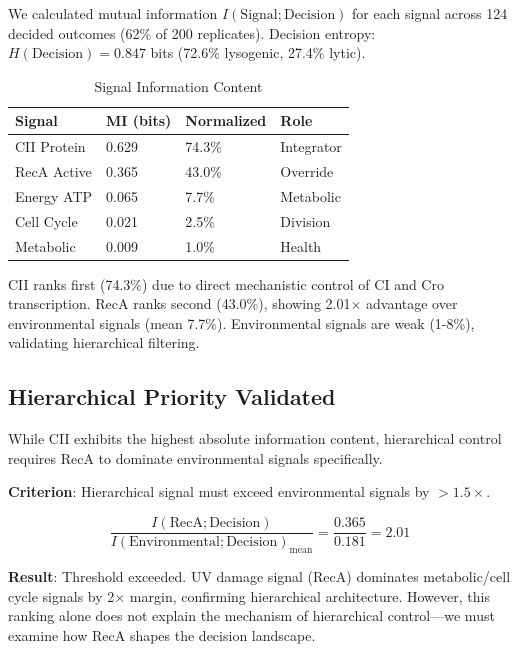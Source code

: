 \documentclass[10pt,twocolumn]{article}
\begin{document}
We calculated mutual information $I(\text{Signal}; \text{Decision})$ for each signal across 124 decided outcomes (62\% of 200 replicates). Decision entropy: $H(\text{Decision}) = 0.847$ bits (72.6\% lysogenic, 27.4\% lytic).

\begin{table}[h]
\centering
\caption{Signal Information Content}
\begin{tabular}{@{}llll@{}}
\toprule
\textbf{Signal} & \textbf{MI (bits)} & \textbf{Normalized} & \textbf{Role} \\
\midrule
CII Protein & 0.629 & 74.3\% & Integrator \\
RecA Active & 0.365 & 43.0\% & Override \\
Energy ATP & 0.065 & 7.7\% & Metabolic \\
Cell Cycle & 0.021 & 2.5\% & Division \\
Metabolic & 0.009 & 1.0\% & Health \\
\bottomrule
\end{tabular}
\end{table}

CII ranks first (74.3\%) due to direct mechanistic control of CI and Cro transcription. RecA ranks second (43.0\%), showing 2.01× advantage over environmental signals (mean 7.7\%). Environmental signals are weak (1-8\%), validating hierarchical filtering.

\subsection{Hierarchical Priority Validated}

While CII exhibits the highest absolute information content, hierarchical control requires RecA to dominate environmental signals specifically.

\textbf{Criterion}: Hierarchical signal must exceed environmental signals by $>1.5\times$.

\begin{equation}
\frac{I(\text{RecA}; \text{Decision})}{I(\text{Environmental}; \text{Decision})_{\text{mean}}} = \frac{0.365}{0.181} = 2.01
\end{equation}

\textbf{Result}: Threshold exceeded. UV damage signal (RecA) dominates metabolic/cell cycle signals by 2× margin, confirming hierarchical architecture. However, this ranking alone does not explain the mechanism of hierarchical control—we must examine how RecA shapes the decision landscape.
\end{document}

